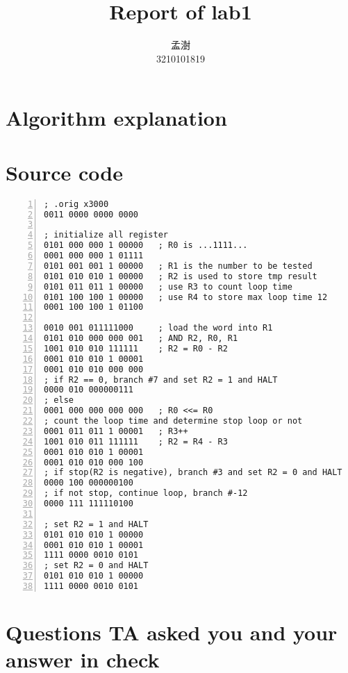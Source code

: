 \documentclass[a4paper, 12pt]{article}
\title{\textbf{Report of lab1}}
\author{孟澍 \\ 3210101819}
\begin{document}
\maketitle

\section{Algorithm explanation}

\section{Source code}
\begin{Verbatim}[frame = single, numbers = left]
; .orig x3000
0011 0000 0000 0000

; initialize all register
0101 000 000 1 00000   ; R0 is ...1111...
0001 000 000 1 01111
0101 001 001 1 00000   ; R1 is the number to be tested
0101 010 010 1 00000   ; R2 is used to store tmp result
0101 011 011 1 00000   ; use R3 to count loop time
0101 100 100 1 00000   ; use R4 to store max loop time 12
0001 100 100 1 01100

0010 001 011111000     ; load the word into R1
0101 010 000 000 001   ; AND R2, R0, R1
1001 010 010 111111    ; R2 = R0 - R2
0001 010 010 1 00001
0001 010 010 000 000
; if R2 == 0, branch #7 and set R2 = 1 and HALT
0000 010 000000111
; else
0001 000 000 000 000   ; R0 <<= R0
; count the loop time and determine stop loop or not
0001 011 011 1 00001   ; R3++
1001 010 011 111111    ; R2 = R4 - R3
0001 010 010 1 00001
0001 010 010 000 100
; if stop(R2 is negative), branch #3 and set R2 = 0 and HALT
0000 100 000000100
; if not stop, continue loop, branch #-12
0000 111 111110100

; set R2 = 1 and HALT
0101 010 010 1 00000
0001 010 010 1 00001
1111 0000 0010 0101
; set R2 = 0 and HALT
0101 010 010 1 00000
1111 0000 0010 0101
\end{Verbatim}
\section{Questions TA asked you and your answer in check}
    
\end{document}
